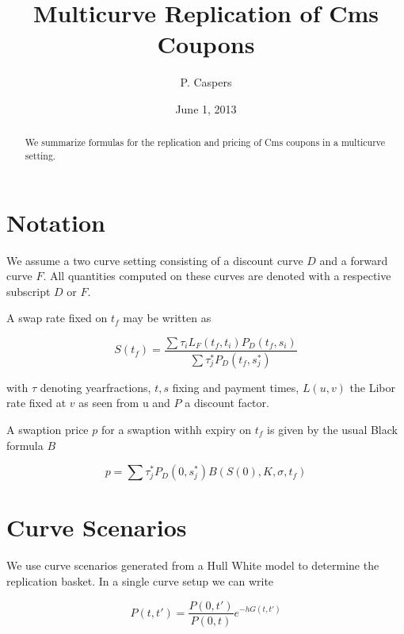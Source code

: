 \documentclass{amsart}
\theoremstyle{plain}
\numberwithin{equation}{section}
\begin{document}

\title[Multicurve Replication of Cms Coupons]{Multicurve Replication of Cms Coupons}
\author{P. Caspers}
\date{June 1, 2013}
\begin{abstract}
We summarize formulas for the replication and pricing of Cms coupons in a multicurve setting.
\end{abstract}

\maketitle

\section{Notation}
We assume a two curve setting consisting of a discount curve $D$ and a forward curve $F$. All quantities computed on 
these curves are denoted with a respective subscript $D$ or $F$.

A swap rate fixed on $t_f$ may be written as

\begin{equation}
S(t_f) = \frac{\sum \tau_i L_F(t_f,t_i) P_D(t_f,s_i)}{\sum \tau^*_j P_D(t_f, s^*_j)}
\end{equation}

with $\tau$ denoting yearfractions, $t, s$ fixing and payment times, $L(u,v)$ the Libor rate fixed at $v$ as seen from u and $P$ a discount factor.

A swaption price $p$ for a swaption withh expiry on $t_f$ is given by the usual Black formula $B$

\begin{equation}
p = \sum \tau^*_j P_D(0,s^*_j) B( S(0), K, \sigma, t_f ) 
\end{equation}

\section{Curve Scenarios}
We use curve scenarios generated from a Hull White model to determine the replication basket. In a single curve setup we can write

\begin{equation}\label{curvescen}
P(t,t') = \frac{P(0,t')}{P(0,t)} e^{ -h G(t,t') }
\end{equation}
\end{document}

